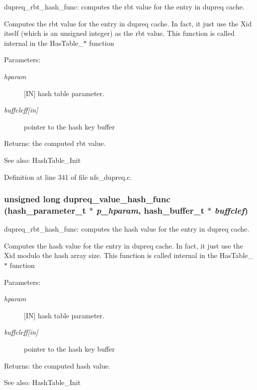 dupreq\_\-rbt\_\-hash\_\-func: computes the rbt value for the entry in dupreq cache.

Computes the rbt value for the entry in dupreq cache. In fact, it just use the Xid itself (which is an unsigned integer) as the rbt value. This function is called internal in the Has\-Table\_\-$\ast$ function

\begin{Desc}
\item[Parameters:]
\begin{description}
\item[{\em hparam}][IN] hash table parameter. \item[{\em buffcleff\mbox{[}in\mbox{]}}]pointer to the hash key buffer\end{description}
\end{Desc}
\begin{Desc}
\item[Returns:]the computed rbt value.\end{Desc}
\begin{Desc}
\item[See also:]Hash\-Table\_\-Init \end{Desc}


Definition at line 341 of file nfs\_\-dupreq.c.
\subsubsection{\setlength{\rightskip}{0pt plus 5cm}unsigned long dupreq\_\-value\_\-hash\_\-func (hash\_\-parameter\_\-t $\ast$ {\em p\_\-hparam}, hash\_\-buffer\_\-t $\ast$ {\em buffclef})}\label{nfs__dupreq_8c_a10}


dupreq\_\-rbt\_\-hash\_\-func: computes the hash value for the entry in dupreq cache.

Computes the hash value for the entry in dupreq cache. In fact, it just use the Xid modulo the hash array size. This function is called internal in the Has\-Table\_\-$\ast$ function

\begin{Desc}
\item[Parameters:]
\begin{description}
\item[{\em hparam}][IN] hash table parameter. \item[{\em buffcleff\mbox{[}in\mbox{]}}]pointer to the hash key buffer\end{description}
\end{Desc}
\begin{Desc}
\item[Returns:]the computed hash value.\end{Desc}
\begin{Desc}
\item[See also:]Hash\-Table\_\-Init \end{Desc}


